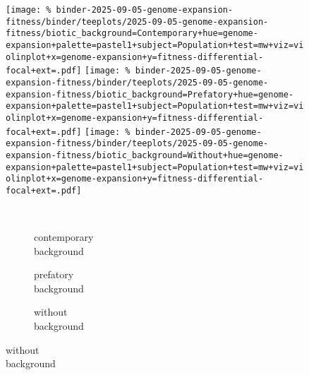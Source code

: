 \begin{figure}

\texttt{[image: \%
binder-2025-09-05-genome-expansion-fitness/binder/teeplots/2025-09-05-genome-expansion-fitness/biotic\_background=Contemporary+hue=genome-expansion+palette=pastel1+subject=Population+test=mw+viz=violinplot+x=genome-expansion+y=fitness-differential-focal+ext=.pdf]}
\texttt{[image: \%
binder-2025-09-05-genome-expansion-fitness/binder/teeplots/2025-09-05-genome-expansion-fitness/biotic\_background=Prefatory+hue=genome-expansion+palette=pastel1+subject=Population+test=mw+viz=violinplot+x=genome-expansion+y=fitness-differential-focal+ext=.pdf]}%
\texttt{[image: \%
binder-2025-09-05-genome-expansion-fitness/binder/teeplots/2025-09-05-genome-expansion-fitness/biotic\_background=Without+hue=genome-expansion+palette=pastel1+subject=Population+test=mw+viz=violinplot+x=genome-expansion+y=fitness-differential-focal+ext=.pdf]}

\vspace{-1ex}

\begin{subfigure}{0.135\linewidth}
~
\end{subfigure}%
\begin{subfigure}{0.305\linewidth}
    \centering
    \caption{\footnotesize contemporary\\background}
    \label{fig:genome-expansion-population:contemporary}
\end{subfigure}%
\begin{subfigure}{0.305\linewidth}
    \centering
    \caption{\footnotesize prefatory\\background}
    \label{fig:genome-expansion-population:prefatory}
\end{subfigure}%
\begin{subfigure}{0.255\linewidth}
    \centering
    \caption{\footnotesize without\\background}
    \label{fig:genome-expansion-population:without}
\end{subfigure}




\end{figure}
